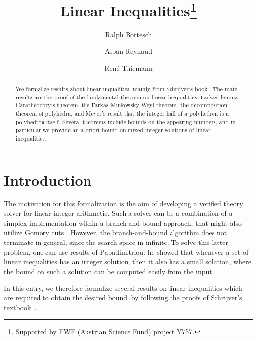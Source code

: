 \documentclass[11pt,a4paper]{article}
\begin{document}
\title{Linear Inequalities\footnote{Supported by FWF (Austrian Science Fund) project Y757.}}
\author[1]{Ralph Bottesch}
\author[2]{Alban Reynaud}
\author[1]{Ren\'e Thiemann}

\maketitle

\begin{abstract}
  We formalize results about linear inqualities, mainly from Schrijver's book
  \cite{schrijver1998theory}.
  The main results are the proof of the fundamental theorem on linear
  inequalities, Farkas' lemma, Carath\'eodory's theorem, 
  the Farkas-Minkowsky-Weyl theorem, 
  the decomposition theorem of
  polyhedra, and Meyer's result that the integer hull of a polyhedron is a
  polyhedron itself. Several theorems include bounds on the appearing
  numbers, and in particular we provide an a-priori bound
  on mixed-integer solutions of linear inequalities. 

\end{abstract}

\tableofcontents

\section{Introduction}

The motivation for this formalization is the aim of developing a verified theory solver
for linear integer arithmetic. Such a solver can be a combination of a simplex-implementation within
a branch-and-bound approach, that might also utilize Gomory cuts \cite[Section 4 of the extended version]{incremental_simplex}. 
However, the branch-and-bound algorithm does
not terminate in general, since the search space in infinite. To solve this latter problem, one can use
results of Papadimitriou: he showed that whenever a set of linear inequalities has an integer
solution, then it also has a small solution, where the bound on such a solution can be computed
easily from the input \cite{Papad}.

In this entry, we therefore formalize several results on linear inequalities which are required
to obtain the desired bound, by following the proofs of Schrijver's 
textbook~\cite[Sections 7 and 16]{schrijver1998theory}.
\end{document}

